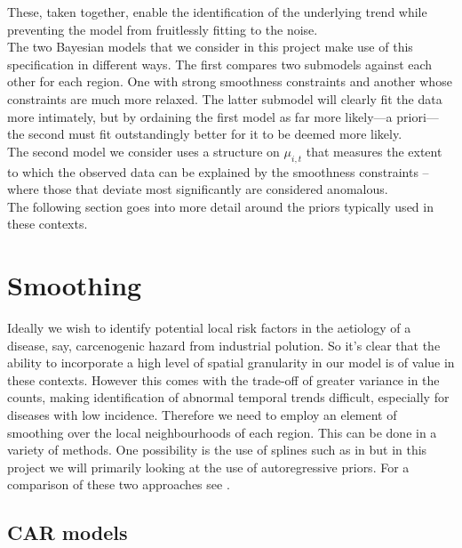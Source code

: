 \documentclass[11pt]{report}
\begin{document}
These, taken together, enable the identification of the underlying trend while preventing the model from fruitlessly fitting to the noise. \\

The two Bayesian models that we consider in this project make use of this specification in different ways. The first compares two submodels against each other for each region. One with strong smoothness constraints and another whose constraints are much more relaxed. The latter submodel will clearly fit the data more intimately, but by ordaining the first model as far more likely---a priori---the second must fit outstandingly better for it to be deemed more likely. \\

The second model we consider uses a structure on $\mu_{i,t}$ that measures the extent to which the observed data can be explained by the smoothness constraints -- where those that deviate most significantly are considered anomalous. \\

The following section goes into more detail around the priors typically used in these contexts.

 



\chapter{Smoothing}

Ideally we wish to identify potential local risk factors in the aetiology of a disease, say, carcenogenic hazard from industrial polution. So it's clear that the ability to incorporate a high level of spatial granularity in our model is of value in these contexts. However this comes with the trade-off of greater variance in the counts, making identification of abnormal temporal trends difficult, especially for diseases with low incidence. Therefore we need to employ an element of smoothing over the local neighbourhoods of each region. This can be done in a variety of methods. One possibility is the use of splines such as in \citet{spline} but in this project we will primarily looking at the use of autoregressive priors. For a comparison of these two approaches see \cite{splinecompare}.   

\section{CAR models} \label{carmodel}
\end{document}
